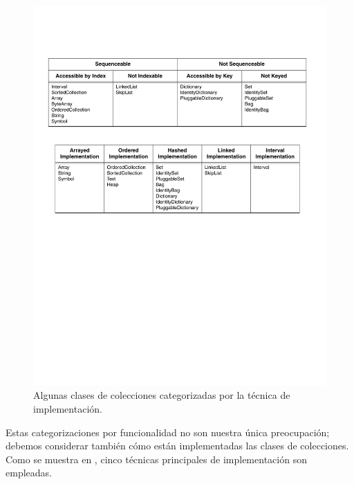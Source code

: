 \documentclass[a4paper,10pt,twoside]{book}
\begin{document}
\begin{figure}
\begin{center}
\includegraphics[width=\textwidth]{CollectionsByImpl}
\caption{Algunas clases de colecciones categorizadas por la t\'ecnica de implementaci\'on.
    }
\end{center}
\end{figure}

Estas categorizaciones por funcionalidad no son nuestra \'unica preocupaci\'on; debemos considerar tambi\'en c\'omo est\'an implementadas las clases de colecciones. Como se muestra en , cinco t\'ecnicas principales de implementaci\'on son empleadas.
\end{document}
